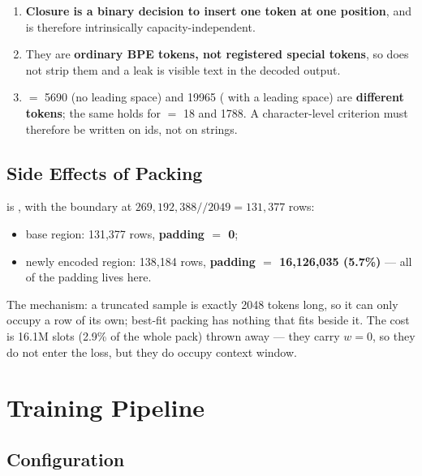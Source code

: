 \documentclass[11pt,openany]{article}
\begin{document}
\begin{enumerate}
\item \textbf{Closure is a binary decision to insert one token at one position}, and is
      therefore intrinsically capacity-independent.
\item They are \textbf{ordinary BPE tokens, not registered special tokens}, so
       does not strip them and a leak is visible text in
      the decoded output.
\item \code{<} $=$ 5690 (no leading space) and 19965 (\code{ >} with a leading space) are
      \textbf{different tokens}; the same holds for \code{/} $=$ 18 and 1788. A
      character-level criterion must therefore be written on ids, not on strings.
\end{enumerate}

\subsection{Side Effects of Packing}
\label{sec:en-data-packing}

 is ,
with the boundary at $269{,}192{,}388 // 2049 = 131{,}377$ rows:

\begin{itemize}
\item base region: 131,377 rows, \textbf{padding $=$ 0};
\item newly encoded region: 138,184 rows, \textbf{padding $=$ 16,126,035 (5.7\%)} --- all
      of the padding lives here.
\end{itemize}

The mechanism: a truncated sample is exactly 2048 tokens long, so it can only occupy a row
of its own; best-fit packing has nothing that fits beside it. The cost is 16.1M slots
(2.9\% of the whole pack) thrown away --- they carry $w = 0$, so they do not enter the
loss, but they do occupy context window.

\section{Training Pipeline}
\label{sec:en-pipe}

\subsection{Configuration}
\label{sec:en-pipe-config}
\end{document}

